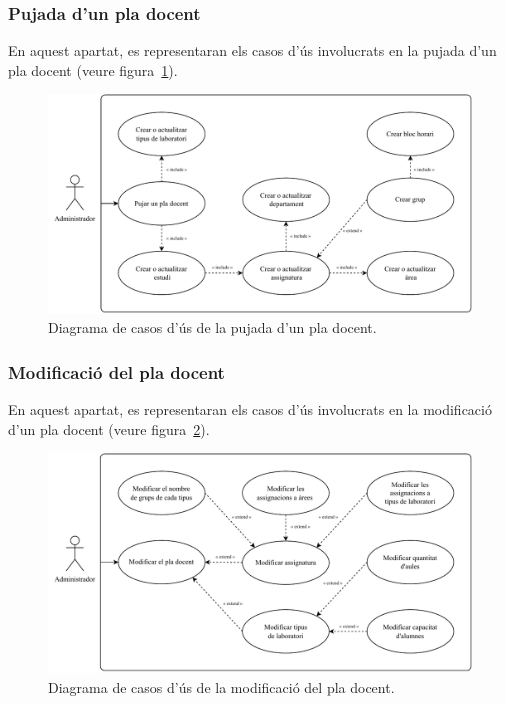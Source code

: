\documentclass[a4paper,12pt]{ThesisStyle}
\begin{document}
\subsubsection{Pujada d'un pla docent}

En aquest apartat, es representaran els casos d'ús involucrats en la pujada d'un pla docent (veure figura~\ref{img:casos_us_pla_pujada}).

\begin{figure}[H]
  \centering
  \includegraphics[width=\textwidth]{assets/use_cases/pla_docent/pujada.pdf}
  \caption{\label{img:casos_us_pla_pujada}Diagrama de casos d'ús de la pujada d'un pla docent.}
\end{figure}

\subsubsection{Modificació del pla docent}

En aquest apartat, es representaran els casos d'ús involucrats en la modificació d'un pla docent (veure figura~\ref{img:casos_us_pla_modif}).

\begin{figure}[H]
  \centering
  \includegraphics[width=\textwidth]{assets/use_cases/pla_docent/modif.pdf}
  \caption{\label{img:casos_us_pla_modif}Diagrama de casos d'ús de la modificació del pla docent.}
\end{figure}
\end{document}
